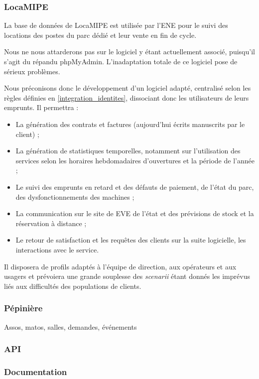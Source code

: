 \subsubsection{LocaMIPE}

La base de données de LocaMIPE est utilisée par l'ENE pour le suivi des
locations des postes du parc dédié et leur vente en fin de cycle.

Nous ne nous attarderons pas sur le logiciel y étant actuellement associé,
puisqu'il s'agit du répandu phpMyAdmin. L'inadaptation totale de ce logiciel
pose de sérieux problèmes.

Nous préconisons donc le développement d'un logiciel adapté, centralisé selon
les règles définies en \ref{integration_identites}, dissociant donc les
utilisateurs de leurs emprunts. Il permettra :
\begin{itemize}
\item La génération des contrats et factures (aujourd'hui écrits manuscrits
      par le client) ;
\item La génération de statistiques temporelles, notamment sur l'utilisation
      des services selon les horaires hebdomadaires d'ouvertures et
      la période de l'année ;
\item Le suivi des emprunts en retard et des défauts de paiement, de l'état
      du parc, des dysfonctionnements des machines ;
\item La communication sur le site de EVE de l'état et des prévisions de
      stock et la réservation à distance ;
\item Le retour de satisfaction et les requêtes des clients sur la suite
      logicielle, les interactions avec le service.
\end{itemize}

Il disposera de profils adaptés à l'équipe de direction, aux opérateurs et
aux usagers et prévoiera une grande souplesse des \textit{scenarii} étant
donnés les imprévus liés aux difficultés des populations de clients.

\subsubsection{Pépinière}

Assos, matos, salles, demandes, événements

\subsubsection{API}

\subsubsection{Documentation}
